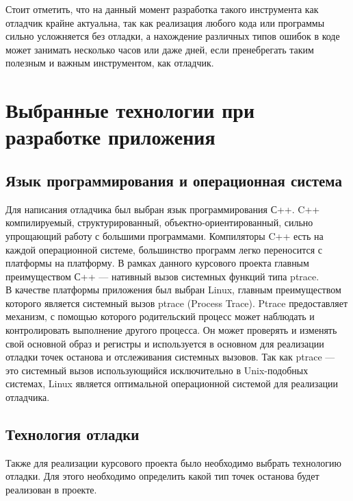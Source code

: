 \documentclass[oneside,final,14pt]{extreport}
\begin{document}
Стоит отметить, что на данный момент разработка такого инструмента как отладчик крайне актуальна, так как реализация любого кода или программы сильно усложняется без отладки, а нахождение различных типов ошибок в коде может занимать несколько часов или даже дней, если пренебрегать таким полезным и важным инструментом, как отладчик.\\
\chapter{Выбранные технологии при разработке приложения}
\section{Язык программирования и операционная система}
Для написания отладчика был выбран язык программирования С++.
C++ компилируемый, структурированный, объектно-ориентированный, сильно упрощающий работу с большими программами. Компиляторы C++ есть на каждой операционной системе, большинство программ легко переносится с платформы на платформу. В рамках данного курсового проекта главным преимуществом С++ — нативный вызов системных функций типа ptrace.\\

В качестве платформы приложения был выбран Linux, главным преимуществом которого является системный вызов ptrace (Process Trace). Ptrace предоставляет механизм, с помощью которого родительский процесс может наблюдать и контролировать выполнение другого процесса. Он может проверять и изменять свой основной образ и регистры и используется в основном для реализации отладки точек останова и отслеживания системных вызовов.
Так как ptrace — это системный вызов использующийся исключительно в Unix-подобных системах, Linux является оптимальной операционной системой для реализации отладчика.
\section{Технология отладки}
Также для реализации курсового проекта было необходимо выбрать технологию отладки. Для этого необходимо определить какой тип точек останова будет реализован в проекте.
\end{document}
